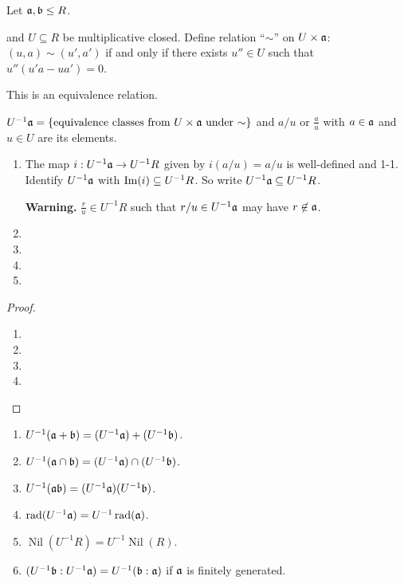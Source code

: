 \noindent Let $\mathfrak{a},\mathfrak{b} \leq R$.

\begin{definition}
    and $U \subseteq R$ be multiplicative closed. Define relation ``$\sim$'' on $U \times \mathfrak{a}$: $(u,a) \sim (u',a')$ if and only if there exists $u'' \in U$ such that $u''(u'a - ua') = 0$.
\end{definition}

\begin{fact}
    This is an equivalence relation.
\end{fact}

\begin{notation}
    $U^{-1}\mathfrak{a} = \{\text{equivalence classes from $U \times \mathfrak{a}$ under $\sim$}\}$ and $a/u$ or $\frac{a}{u}$ with $a \in \mathfrak{a}$ and $u \in U$ are its elements.
\end{notation}

\begin{proposition}
    \begin{enumerate}
        \item The map $i: U^{-1}\mathfrak{a} \to U^{-1}R$ given by $i(a/u) = a/u$ is well-defined and 1-1. Identify $U^{-1}\mathfrak{a}$ with $\operatorname{Im}(i) \subseteq U^{-1}R$. So write $U^{-1}\mathfrak{a} \subseteq U^{-1}R$. \par 
            \textbf{Warning.} $\frac{r}{u} \in U^{-1}R$ such that $r/u \in U^{-1}\mathfrak{a}$ may have $r \not \in \mathfrak{a}$.
        \item 
        \item 
        \item 
        \item 
    \end{enumerate}
\end{proposition}

\begin{proof}
    \begin{enumerate}
        \item 
        \item 
        \item 
        \item 
    \end{enumerate}
\end{proof}

\begin{proposition}
    \begin{enumerate}
        \item $U^{-1}(\mathfrak{a} + \mathfrak{b}) = (U^{-1}\mathfrak{a}) + (U^{-1}\mathfrak{b})$.
        \item $U^{-1}(\mathfrak{a} \cap \mathfrak{b}) = (U^{-1}\mathfrak{a}) \cap (U^{-1}\mathfrak{b})$.
        \item $U^{-1}(\mathfrak{a} \mathfrak{b}) = (U^{-1}\mathfrak{a}) (U^{-1}\mathfrak{b})$.
        \item $\operatorname{rad}(U^{-1}\mathfrak{a}) = U^{-1} \operatorname{rad}(\mathfrak{a})$.
        \item $\operatorname{Nil}(U^{-1}R) = U^{-1}\operatorname{Nil}(R)$.
        \item $(U^{-1}\mathfrak{b}:U^{-1}\mathfrak{a}) = U^{-1}(\mathfrak{b}:\mathfrak{a})$ if $\mathfrak{a}$ is finitely generated.
    \end{enumerate}
\end{proposition}

